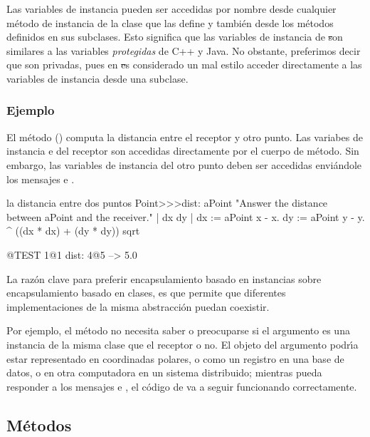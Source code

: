 \documentclass[a4paper,10pt,twoside]{book}
\begin{document}
Las variables de instancia pueden ser accedidas por nombre desde cualquier m\'etodo de instancia de la clase que las define y tambi\'en desde los m\'etodos definidos en sus subclases. Esto significa que las variables de instancia de \st son similares a las variables  \emph{protegidas} de C++ y Java.      
No obstante, preferimos decir que son privadas, pues en \st es considerado un mal estilo acceder directamente a las variables de instancia desde una subclase.  



\subsubsection{Ejemplo}

El m\'etodo  () computa la distancia entre el receptor y otro punto. Las variabes de instancia  e  del receptor son accedidas directamente por el cuerpo de m\'etodo. Sin embargo, las variables de instancia del otro punto deben ser accedidas envi\'andole los mensajes  e .


\begin{method}[dist:]{la distancia entre dos puntos}
Point>>>dist: aPoint 
	"Answer the distance between aPoint and the receiver."  
	| dx dy |
	dx := aPoint x - x.
	dy :=  aPoint y - y.
	^ ((dx * dx) + (dy * dy)) sqrt
\end{method}

\begin{code}{@TEST}
1@1 dist: 4@5 --> 5.0
\end{code}

La raz\'on clave para preferir encapsulamiento basado en instancias sobre encapsulamiento basado en clases, es que permite que diferentes implementaciones de la misma abstracci\'on puedan coexistir. 

Por ejemplo, el m\'etodo  no necesita saber o preocuparse si el argumento  es una instancia de la misma clase que el receptor o no. El objeto del argumento podr\'\i{}a estar representado en coordinadas polares, o como un registro en una base de datos, o en otra computadora en un sistema distribuido; mientras pueda responder a los mensajes  e , el c\'odigo de  va a seguir funcionando correctamente.

\subsection{M\'etodos}
\end{document}
